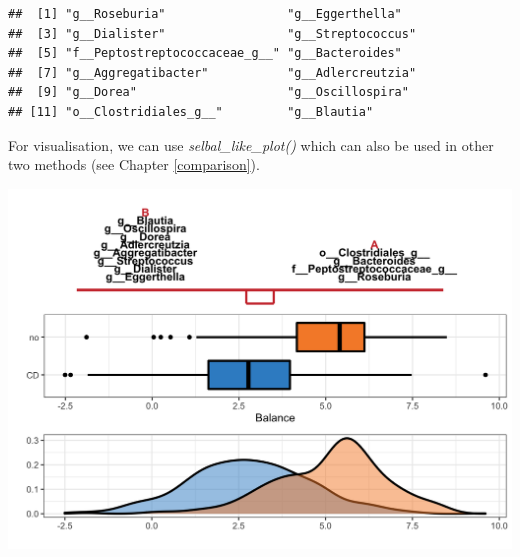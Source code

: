 \documentclass[openany]{book}
\newenvironment{Shaded}{\begin{snugshade}}{\end{snugshade}}
\newcommand{\KeywordTok}[1]{\textcolor[rgb]{0.13,0.29,0.53}{\textbf{#1}}}
\newcommand{\DataTypeTok}[1]{\textcolor[rgb]{0.13,0.29,0.53}{#1}}
\newcommand{\StringTok}[1]{\textcolor[rgb]{0.31,0.60,0.02}{#1}}
\newcommand{\OtherTok}[1]{\textcolor[rgb]{0.56,0.35,0.01}{#1}}
\newcommand{\OperatorTok}[1]{\textcolor[rgb]{0.81,0.36,0.00}{\textbf{#1}}}
\newcommand{\NormalTok}[1]{#1}
\begin{document}
\begin{verbatim}
##  [1] "g__Roseburia"                 "g__Eggerthella"              
##  [3] "g__Dialister"                 "g__Streptococcus"            
##  [5] "f__Peptostreptococcaceae_g__" "g__Bacteroides"              
##  [7] "g__Aggregatibacter"           "g__Adlercreutzia"            
##  [9] "g__Dorea"                     "g__Oscillospira"             
## [11] "o__Clostridiales_g__"         "g__Blautia"
\end{verbatim}

For visualisation, we can use \emph{selbal\_like\_plot()} which can also
be used in other two methods (see Chapter \ref{comparison}).

\begin{Shaded}
\end{Shaded}

\begin{center}\includegraphics[width=1\linewidth]{./Generated_plots/unnamed-chunk-18-1} \end{center}
\end{document}

